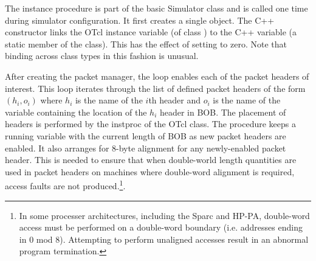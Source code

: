 The  instance procedure is part of the
basic Simulator class and is called one time during simulator
configuration.
It first creates a single  object.
The C++ constructor links the OTcl instance
variable  (of class )
to the C++ variable  (a static
member of the  class).
This has the effect of setting  to
zero.
Note that binding across class types in this fashion is
unusual.

\label{sec:configpacket}
After creating the packet manager, the 
loop enables each of the packet headers of interest.
This loop iterates through the list of defined
packet headers of the form
$(h_i, o_i)$ where $h_i$ is the name of the  $i$th header
and $o_i$ is the name of the variable containing the
location of the $h_i$ header in BOB.
The placement of headers is performed by the 
instproc of the  OTcl class.
The procedure keeps a running variable  with
the current length of BOB as new packet headers are enabled.
It also arranges for 8-byte alignment for any newly-enabled packet
header.
This is needed to ensure that when double-world length quantities
are used in packet headers on machines where double-word alignment
is required, access faults are not produced.\footnote{In
some processer architectures, including the
Sparc and HP-PA, double-word access must be performed on a double-word
boundary (i.e. addresses ending in 0 mod 8).  Attempting to perform
unaligned accesses result in an abnormal program termination.}.
